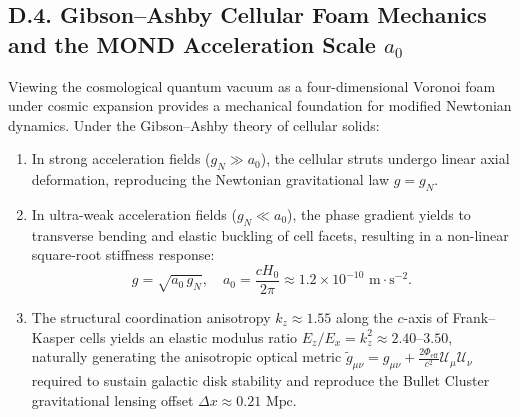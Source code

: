 \subsection*{D.4. Gibson--Ashby Cellular Foam Mechanics and the MOND Acceleration Scale $a_0$}
Viewing the cosmological quantum vacuum as a four-dimensional Voronoi foam under cosmic expansion provides a mechanical foundation for modified Newtonian dynamics. Under the Gibson--Ashby theory of cellular solids:
\begin{enumerate}
\item In strong acceleration fields ($g_N \gg a_0$), the cellular struts undergo linear axial deformation, reproducing the Newtonian gravitational law $g = g_N$.
\item In ultra-weak acceleration fields ($g_N \ll a_0$), the phase gradient yields to transverse bending and elastic buckling of cell facets, resulting in a non-linear square-root stiffness response:
\begin{equation}\label{eq:D.7}\tag{D.7}
g = \sqrt{a_0 \, g_N}, \quad a_0 = \frac{c H_0}{2\pi} \approx 1.2 \times 10^{-10}\text{ m}\cdot\text{s}^{-2}.
\end{equation}
\item The structural coordination anisotropy $k_z \approx 1.55$ along the $c$-axis of Frank--Kasper cells yields an elastic modulus ratio $E_z / E_x = k_z^2 \approx 2.40\text{--}3.50$, naturally generating the anisotropic optical metric $\tilde{g}_{\mu\nu} = g_{\mu\nu} + \frac{2\Phi_{\text{eff}}}{c^2}\mathcal{U}_\mu \mathcal{U}_\nu$ required to sustain galactic disk stability and reproduce the Bullet Cluster gravitational lensing offset $\Delta x \approx 0.21\text{ Mpc}$.
\end{enumerate}

